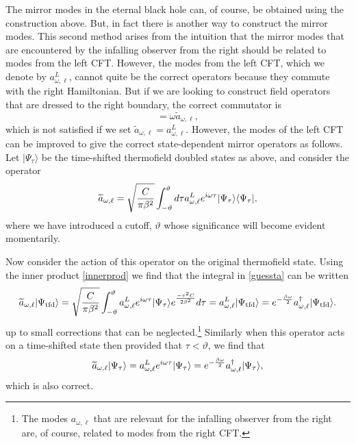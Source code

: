 \documentclass[12pt]{article}
\newcommand{\tfd}{\Psi_{\text{tfd}}} %
\newcommand{\tfdtau}{\Psi_{\tau}} %
\newcommand{\cop}[1]{#1}
\def\ta{\widetilde{\cop{a}}}
\def\cutoffT{\vartheta}
\newcommand{\be}{\begin{equation}}
\newcommand{\ee}{\end{equation}}
\begin{document}
The mirror modes in the eternal black hole can, of course, be obtained using the construction above. But, in fact there is another way to construct the mirror modes. This second method arises from
the intuition that the mirror modes that are encountered by the infalling observer from the right should be related to modes from the left CFT. However, the modes from the left CFT, which we denote by $a^{L}_{\omega, \ell}$, cannot quite be the correct operators because they commute with the right Hamiltonian. But if we are looking to construct field operators that are dressed to the right boundary, the correct commutator is
\be
[H_R, \ta_{\omega, \ell}] = \omega \ta_{\omega, \ell},
\ee
which is not satisfied if we set $\ta_{\omega, \ell} = a^{L}_{\omega, \ell}$. However, the modes of the left CFT can be improved to give the correct state-dependent mirror operators as follows.
Let  $|\tfdtau \rangle$ be the time-shifted thermofield doubled states as above, and consider the operator
\be
\label{guessta}
\ta_{\omega, \ell} = {\sqrt{ C \over \pi \beta^2}} \int_{-\cutoffT}^{\cutoffT} d \tau  a^{L}_{\omega, \ell} e^{i \omega \tau} |\tfdtau \rangle \langle \tfdtau |, 
\ee
where we have introduced a cutoff, $\cutoffT$ whose significance will become evident momentarily. 

Now consider the action of this operator on the original thermofield state. Using the inner product \eqref{innerprod} we find that the integral in \eqref{guessta} can be written
\be
\label{actionontfd}
\ta_{\omega, \ell} |\tfd \rangle = {\sqrt{ C \over \pi \beta^2}} \int_{-\cutoffT}^{\cutoffT} a^L_{\omega, \ell} e^{i \omega \tau} | \tfdtau \rangle e^{-\tau^2 C \over 2 \beta^2} d \tau = a_{\omega, \ell}^L | \tfd \rangle = e^{-{\beta \omega \over 2}} a_{\omega, \ell}^{\dagger} | \tfd \rangle.
\ee
up to small corrections that can be neglected.\footnote{The modes $a_{\omega, \ell}$ that are relevant for the infalling observer from the right are, of course, related to modes from the right CFT.} Similarly when this operator acts on a time-shifted state then provided that $\tau < \cutoffT$, we find that
\be
\ta_{\omega, \ell} |\tfdtau \rangle = a^L_{\omega, \ell} e^{i \omega \tau} | \tfdtau \rangle =  e^{-{\beta \omega \over 2}} a_{\omega, \ell}^{\dagger} | \tfdtau \rangle,
\ee
which is also correct.
\end{document}
